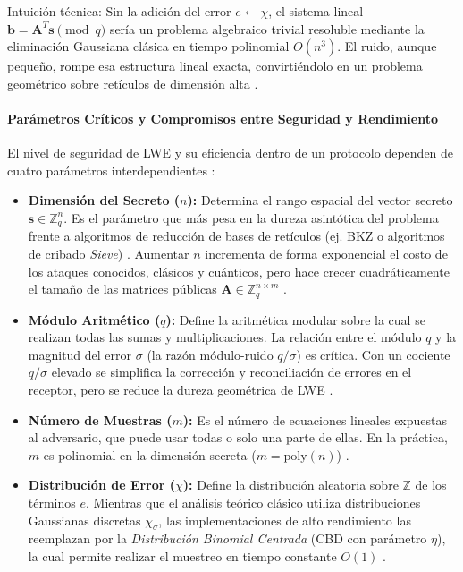 Intuición técnica: Sin la adición del error $e \leftarrow \chi$, el sistema lineal $\mathbf{b} = \mathbf{A}^T \mathbf{s} \pmod q$ sería un problema algebraico trivial resoluble mediante la eliminación Gaussiana clásica en tiempo polinomial $O(n^3)$. El ruido, aunque pequeño, rompe esa estructura lineal exacta, convirtiéndolo en un problema geométrico sobre retículos de dimensión alta \cite{regev2009lwe, mukil2026implementing}.

\paragraph{Parámetros Críticos y Compromisos entre Seguridad y Rendimiento}

El nivel de seguridad de LWE y su eficiencia dentro de un protocolo dependen de cuatro parámetros interdependientes \cite{regev2009lwe, yang2025multiserver}:

\begin{itemize}
    \item \textbf{Dimensión del Secreto ($n$):} Determina el rango espacial del vector secreto $\mathbf{s} \in \mathbb{Z}_q^n$. Es el parámetro que más pesa en la dureza asintótica del problema frente a algoritmos de reducción de bases de retículos (ej. BKZ o algoritmos de cribado \textit{Sieve}) \cite{mukil2026implementing}. Aumentar $n$ incrementa de forma exponencial el costo de los ataques conocidos, clásicos y cuánticos, pero hace crecer cuadráticamente el tamaño de las matrices públicas $\mathbf{A} \in \mathbb{Z}_q^{n \times m}$ \cite{yang2025multiserver, ma2026laasso}.

    \item \textbf{Módulo Aritmético ($q$):} Define la aritmética modular sobre la cual se realizan todas las sumas y multiplicaciones. La relación entre el módulo $q$ y la magnitud del error $\sigma$ (la razón módulo-ruido $q/\sigma$) es crítica. Con un cociente $q/\sigma$ elevado se simplifica la corrección y reconciliación de errores en el receptor, pero se reduce la dureza geométrica de LWE \cite{yang2025multiserver, rewal2023quantumsafe}.

    \item \textbf{Número de Muestras ($m$):} Es el número de ecuaciones lineales expuestas al adversario, que puede usar todas o solo una parte de ellas. En la práctica, $m$ es polinomial en la dimensión secreta ($m = \text{poly}(n)$) \cite{yang2025multiserver}.

    \item \textbf{Distribución de Error ($\chi$):} Define la distribución aleatoria sobre $\mathbb{Z}$ de los términos $e$. Mientras que el análisis teórico clásico utiliza distribuciones Gaussianas discretas $\chi_\sigma$, las implementaciones de alto rendimiento las reemplazan por la \textit{Distribución Binomial Centrada} (CBD con parámetro $\eta$), la cual permite realizar el muestreo en tiempo constante $O(1)$ \cite{yang2025multiserver, mukil2026implementing}.
\end{itemize}

